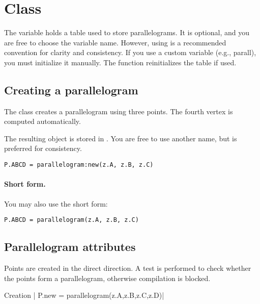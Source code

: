 \newpage
\section{Class }
The variable  holds a table used to store parallelograms. It is optional, and you are free to choose the variable name. However, using  is a recommended convention for clarity and consistency. If you use a custom variable (e.g., parall), you must initialize it manually. The  function reinitializes the  table if used.


\subsection{Creating a parallelogram}
\label{sub:creating_a_parallelogram}

The  class creates a parallelogram using three points. The fourth vertex is computed automatically.

\medskip
The resulting object is stored in . You are free to use another name, but  is preferred for consistency.

\begin{mybox}
\begin{verbatim}
P.ABCD = parallelogram:new(z.A, z.B, z.C)
\end{verbatim}
\end{mybox}

\paragraph{Short form.}
You may also use the short form:

\begin{mybox}
\begin{verbatim}
P.ABCD = parallelogram(z.A, z.B, z.C)
\end{verbatim}
\end{mybox}

\subsection{Parallelogram attributes}

Points are created in the direct direction. A test is performed to check whether the points form a parallelogram, otherwise compilation is blocked.

\begin{mybox}
Creation | P.new = parallelogram(z.A,z.B,z.C,z.D)|
\end{mybox}

